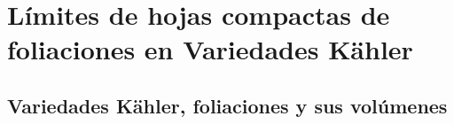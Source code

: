 \documentclass[letterpaper]{beamer}
\newcommand{\co}{\ensuremath{\mathbb C }}
\newcommand{\con}{\ensuremath{\mathbb{C}^n}}
\begin{document}

\section{L\'imites de hojas compactas de foliaciones en Variedades K\"ahler}
\subsection{Variedades K\"ahler, foliaciones y sus vol\'umenes}
\end{document}
